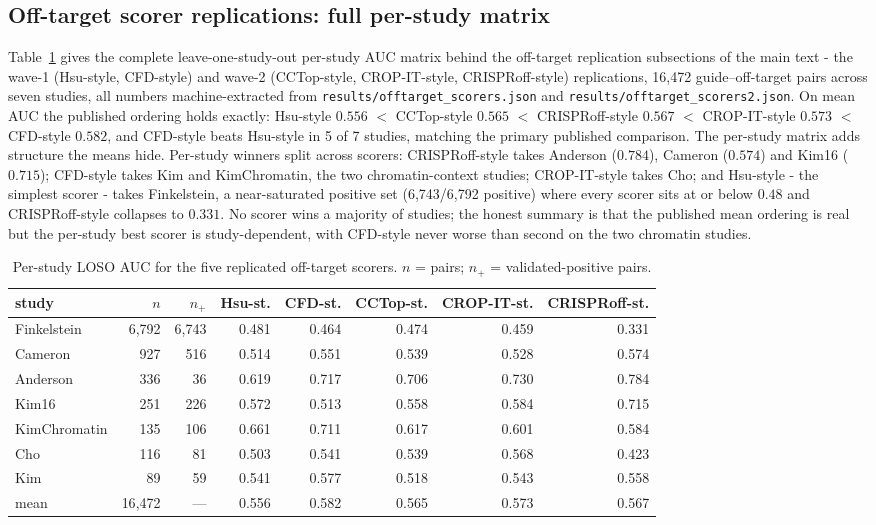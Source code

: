 \subsection{Off-target scorer replications: full per-study matrix}
\label{app:offtarget-matrix}
Table~\ref{tab:offtarget-matrix} gives the complete leave-one-study-out
per-study AUC matrix behind the off-target replication subsections of the
main text - the wave-1 (Hsu-style, CFD-style) and wave-2 (CCTop-style,
CROP-IT-style, CRISPRoff-style) replications, 16{,}472 guide--off-target
pairs across seven studies, all numbers machine-extracted from
\texttt{results/}\allowbreak\texttt{offtarget\_scorers.json}
and \texttt{results/}\allowbreak\texttt{offtarget\_scorers2.json}.
On mean AUC the published
ordering holds exactly: Hsu-style $0.556$ $<$ CCTop-style $0.565$ $<$
CRISPRoff-style $0.567$ $<$ CROP-IT-style $0.573$ $<$ CFD-style $0.582$,
and CFD-style beats Hsu-style in 5 of 7 studies, matching the primary
published comparison. The per-study matrix adds structure the means hide.
Per-study winners split across scorers: CRISPRoff-style takes Anderson
($0.784$), Cameron ($0.574$) and Kim16 ($0.715$); CFD-style takes Kim and
KimChromatin, the two chromatin-context studies; CROP-IT-style takes Cho;
and Hsu-style - the simplest scorer - takes Finkelstein, a near-saturated
positive set (6{,}743/6{,}792 positive) where every scorer sits at or
below $0.48$ and CRISPRoff-style collapses to $0.331$. No scorer wins a
majority of studies; the honest summary is that the published mean
ordering is real but the per-study best scorer is study-dependent, with
CFD-style never worse than second on the two chromatin studies.
\begin{table}[h]
\centering
\caption{Per-study LOSO AUC for the five replicated off-target scorers.
$n$ = pairs; $n_+$ = validated-positive pairs.}
\label{tab:offtarget-matrix}
\small
\begin{tabular}{lrr|rr|rrr}
\hline
study & $n$ & $n_+$ & Hsu-st. & CFD-st. & CCTop-st. & CROP-IT-st. & CRISPRoff-st. \\
\hline
Finkelstein & 6{,}792 & 6{,}743 & 0.481 & 0.464 & 0.474 & 0.459 & 0.331 \\
Cameron & 927 & 516 & 0.514 & 0.551 & 0.539 & 0.528 & 0.574 \\
Anderson & 336 & 36 & 0.619 & 0.717 & 0.706 & 0.730 & 0.784 \\
Kim16 & 251 & 226 & 0.572 & 0.513 & 0.558 & 0.584 & 0.715 \\
KimChromatin & 135 & 106 & 0.661 & 0.711 & 0.617 & 0.601 & 0.584 \\
Cho & 116 & 81 & 0.503 & 0.541 & 0.539 & 0.568 & 0.423 \\
Kim & 89 & 59 & 0.541 & 0.577 & 0.518 & 0.543 & 0.558 \\
\hline
mean & 16{,}472 & --- & 0.556 & 0.582 & 0.565 & 0.573 & 0.567 \\
\hline
\end{tabular}
\end{table}
